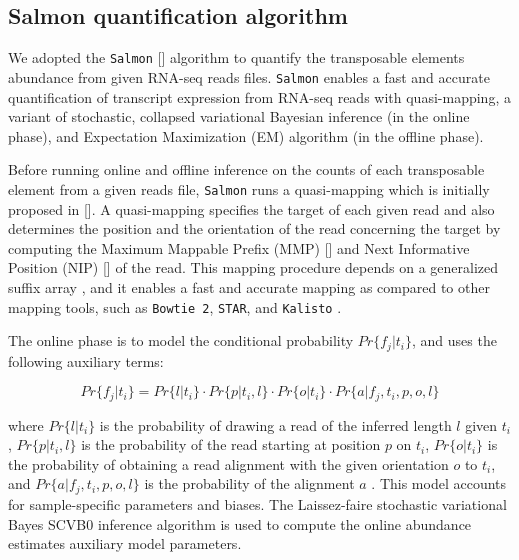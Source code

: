 \documentclass[wsdraft]{ws-procs11x85}
\begin{document}
\subsection{Salmon quantification algorithm}
We adopted the \verb|Salmon| [] algorithm to quantify the transposable elements abundance from given RNA-seq reads files. \verb|Salmon| enables a fast and accurate quantification of transcript expression from RNA-seq reads with quasi-mapping, a variant of stochastic, collapsed variational Bayesian inference (in the online phase), and Expectation Maximization (EM) algorithm (in the offline phase)\cite{patro2017salmon,srivastava2016rapmap,bishop2006pattern,foulds2013stochastic}. 

Before running online and offline inference on the counts of each transposable element from a given reads file, \verb|Salmon| runs a quasi-mapping which is initially proposed in []. A quasi-mapping specifies the target of each given read and also determines the position and the orientation of the read concerning the target by computing the
Maximum Mappable Prefix (MMP) [] and Next Informative Position (NIP) [] of the read.
This mapping procedure depends on a generalized suffix array \cite{manber1993suffix},  and it enables a fast and accurate mapping as compared to other mapping tools, such as \verb|Bowtie 2|, \verb|STAR|, and \verb|Kalisto| \cite{srivastava2016rapmap}. 

The online phase is to model the conditional probability $Pr \{f_j | t_i \}$, and uses the following auxiliary terms:

\begin{equation}
Pr \{f_j | t_i \} = Pr \{ l | t_i \} 
\cdot Pr \{ p | t_i, l \} 
\cdot Pr \{ o | t_i \} 
\cdot Pr \{ a | f_j, t_i, p, o, l \} 
\end{equation}

where $Pr \{ l | t_i \}$  is the probability of drawing a read of the inferred length $l$ given $t_i$,  
$Pr \{ p | t_i, l \}$ is the probability of the read starting at position $p$ on $t_i$,
$Pr \{ o | t_i \}$ is the probability of obtaining a read
alignment with the given orientation $o$ to $t_i$, and
$Pr \{ a | f_j, t_i, p, o, l \} $ is the probability of the alignment $a$ \cite{patro2017salmon}. 
This model accounts for sample-specific parameters and biases.
The Laissez-faire stochastic variational Bayes SCVB0 inference algorithm is used to 
compute the online abundance estimates auxiliary model parameters\cite{patro2017salmon}.
\end{document}

